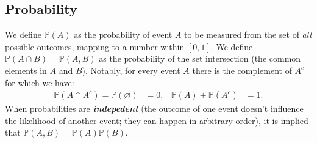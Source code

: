 \documentclass{article}
\begin{document}
\subsection{Probability}
We define $\mathbb{P}(A)$ as the probability of event $A$ to be measured from the set of \textit{all} possible outcomes, mapping to a number within $[0,1]$. We define $\mathbb{P}(A\cap B)=\mathbb{P}(A,B)$ as the probability of the set intersection (the common elements in $A$ and $B$). Notably, for every event $A$ there is the complement of $A^c$ for which we have:
\begin{align}
    \mathbb{P}(A\cap A^c)=\mathbb{P}(\varnothing)&=0,&
    \mathbb{P}(A) + \mathbb{P}(A^c)&=1.
\end{align}
When probabilities are \textit{\textbf{indepedent}} (the outcome of one event doesn't influence the likelihood of another event; they can happen in arbitrary order), it is implied that $\mathbb{P}(A,B)=\mathbb{P}(A)\mathbb{P}(B)$.
\end{document}
